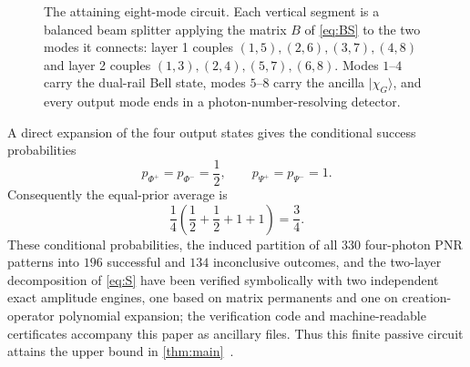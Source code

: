 \documentclass[11pt]{article}
\theoremstyle{remark}
\newcommand{\ket}[1]{\lvert #1\rangle}
\begin{document}
\begin{figure}[t]
\centering
{}
\caption{The attaining eight-mode circuit. Each vertical segment is a
balanced beam splitter applying the matrix \(B\) of \cref{eq:BS} to the two
modes it connects: layer 1 couples \((1,5),(2,6),(3,7),(4,8)\) and layer 2
couples \((1,3),(2,4),(5,7),(6,8)\). Modes \(1\)--\(4\) carry the dual-rail
Bell state, modes \(5\)--\(8\) carry the ancilla \(\ket{\chi_G}\), and every
output mode ends in a photon-number-resolving detector.}
\label{fig:circuit}
\end{figure}

A direct expansion of the four output states gives the conditional success
probabilities
\begin{equation}
  p_{\Phi^+}=p_{\Phi^-}=\frac12,
  \qquad
  p_{\Psi^+}=p_{\Psi^-}=1.
  \label{eq:grice-success}
\end{equation}
Consequently the equal-prior average is
\begin{equation}
  \frac14\left(\frac12+\frac12+1+1\right)=\frac34.
\end{equation}
These conditional probabilities, the induced partition of all \(330\)
four-photon PNR patterns into \(196\) successful and \(134\) inconclusive
outcomes, and the two-layer decomposition of \cref{eq:S} have been verified
symbolically with two independent exact amplitude engines, one based on
matrix permanents and one on creation-operator polynomial expansion; the
verification code and machine-readable certificates accompany this paper as
ancillary files. Thus this finite passive circuit attains the upper bound in
\cref{thm:main}~\cite{Grice2011}.
\end{document}
